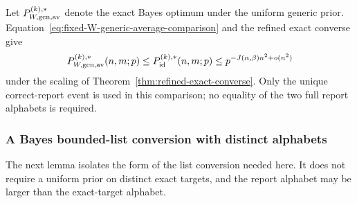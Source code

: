 \documentclass[11pt]{article}
\newcommand{\1}{\mathbf 1}
\theoremstyle{plain}
\theoremstyle{definition}
\theoremstyle{remark}
\begin{document}
Let $P_{W,\rm gen,av}^{(k),*}$ denote the exact Bayes optimum under the uniform
generic prior.  Equation~\eqref{eq:fixed-W-generic-average-comparison} and the
refined exact converse give
\begin{equation}
 P_{W,\rm gen,av}^{(k),*}(n,m;p)
 \le P_{\mathrm{id}}^{(k),*}(n,m;p)
 \le p^{-J(\alpha,\beta)n^2+o(n^2)}
 \label{eq:generic-original-exact-converse}
\end{equation}
under the scaling of Theorem~\ref{thm:refined-exact-converse}.  Only the unique
correct-report event is used in this comparison; no equality of the two full
report alphabets is required.

\subsubsection{A Bayes bounded-list conversion with distinct alphabets}
\label{subsubsec:generic-original-bayes-list-conversion}

The next lemma isolates the form of the list conversion needed here.  It does
not require a uniform prior on distinct exact targets, and the report alphabet
may be larger than the exact-target alphabet.
\end{document}
